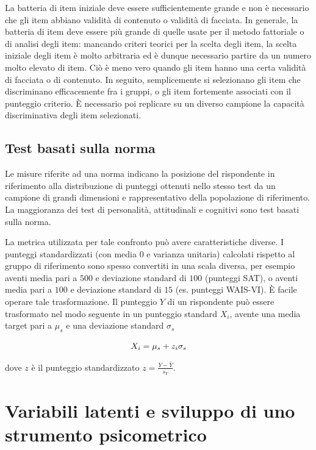 \documentclass[
  11pt,
]{krantz}
\theoremstyle{definition}
\theoremstyle{definition}
\theoremstyle{definition}
\theoremstyle{definition}
\theoremstyle{remark}
\begin{document}
La batteria di item iniziale deve essere sufficientemente grande e non è necessario che gli item abbiano validità di contenuto o validità di facciata. In generale, la batteria di item deve essere più grande di quelle usate per il metodo fattoriale o di analisi degli item: mancando criteri teorici per la scelta degli item, la scelta iniziale degli item è molto arbitraria ed è dunque necessario partire da un numero molto elevato di item. Ciò è meno vero quando gli item hanno una certa validità di facciata o di contenuto. In seguito, semplicemente si selezionano gli item che discriminano efficacemente fra i gruppi, o gli item fortemente associati con il punteggio criterio. È necessario poi replicare su un diverso campione la capacità discriminativa degli item selezionati.

\hypertarget{test-basati-sulla-norma}{%
\subsection{Test basati sulla norma}\label{test-basati-sulla-norma}}

Le misure riferite ad una norma indicano la posizione del rispondente in riferimento alla distribuzione di punteggi ottenuti nello stesso test da un campione di grandi dimensioni e rappresentativo della popolazione di riferimento. La maggioranza dei test di personalità, attitudinali e cognitivi sono test basati sulla norma.

La metrica utilizzata per tale confronto può avere caratteristiche diverse. I punteggi standardizzati (con media \(0\) e varianza unitaria) calcolati rispetto al gruppo di riferimento sono spesso convertiti in una scala diversa, per esempio aventi media pari a \(500\) e deviazione standard di \(100\) (punteggi SAT), o aventi media pari a \(100\) e deviazione standard di \(15\) (es. punteggi WAIS-VI). È facile operare tale trasformazione. Il punteggio \(Y\) di un rispondente può essere trasformato nel modo seguente in un punteggio standard \(X_i\), avente una media target pari a \(\mu_s\) e una deviazione standard \(\sigma_s\)

\[X_i = \mu_s + z_i \sigma_s\notag\]

dove \(z\) è il punteggio standardizzato \(z=\frac{Y-\bar{Y}}{s_Y}\).

\hypertarget{variabili-latenti-e-sviluppo-di-uno-strumento-psicometrico}{%
\section{Variabili latenti e sviluppo di uno strumento psicometrico}\label{variabili-latenti-e-sviluppo-di-uno-strumento-psicometrico}}
\end{document}
